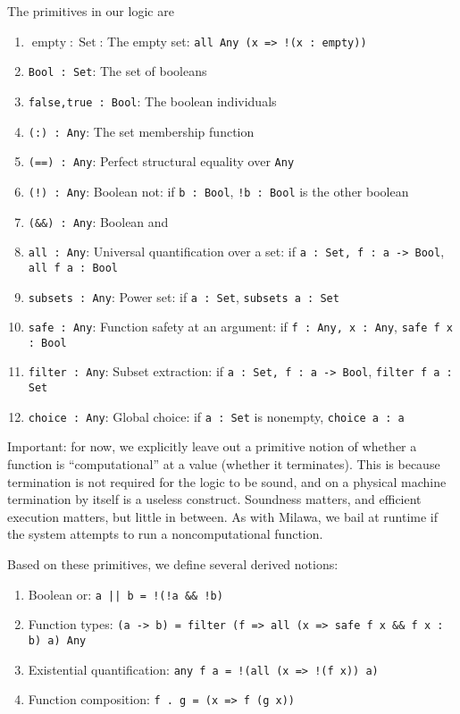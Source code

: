 \documentclass[11pt]{article}
\newcommand{\cc}[1]{\texttt{#1}}
\newcommand{\Set}{\operatorname{Set}}
\newcommand{\empty}{\operatorname{empty}}
\begin{document}
The primitives in our logic are

\begin{enumerate}
\item $\empty : \Set$: The empty set: \cc{all Any (x => !(x : empty))}
\item \cc{Bool : Set}: The set of booleans
\item \cc{false,true : Bool}: The boolean individuals
\item \cc{(:) : Any}: The set membership function
\item \cc{(==) : Any}: Perfect structural equality over \cc{Any}
\item \cc{(!) : Any}: Boolean not: if \cc{b : Bool}, \cc{!b : Bool} is the other boolean
\item \cc{(\&\&) : Any}: Boolean and
\item \cc{all : Any}: Universal quantification over a set: if \cc{a : Set, f : a -> Bool}, \cc{all f a : Bool}
\item \cc{subsets : Any}: Power set: if \cc{a : Set}, \cc{subsets a : Set}
\item \cc{safe : Any}: Function safety at an argument: if \cc{f : Any, x : Any}, \cc{safe f x : Bool}
\item \cc{filter : Any}: Subset extraction: if \cc{a : Set, f : a -> Bool}, \cc{filter f a : Set}
\item \cc{choice : Any}: Global choice: if \cc{a : Set} is nonempty, \cc{choice a : a}
\end{enumerate}

Important: for now, we explicitly leave out a primitive notion of whether a function is ``computational''
at a value (whether it terminates).  This is because termination is not required for the logic to be
sound, and on a physical machine termination by itself is a useless construct.  Soundness matters, and
efficient execution matters, but little in between.  As with Milawa, we bail at runtime
if the system attempts to run a noncomputational function.

Based on these primitives, we define several derived notions:

\begin{enumerate}
\item Boolean or: \cc{a || b = !(!a \&\& !b)}
\item Function types: \cc{(a -> b) = filter (f => all (x => safe f x \&\& f x : b) a) Any}
\item Existential quantification: \cc{any f a = !(all (x => !(f x)) a)}
\item Function composition: \cc{f . g = (x => f (g x))}
\end{enumerate}
\end{document}

